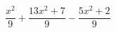 \begin{ex}
	\begin{condition}
		\( \dfrac{x^2}{9}+\dfrac{13x^2+7}{9}-\dfrac{5x^2+2}{9} \)
	\end{condition}
\end{ex}